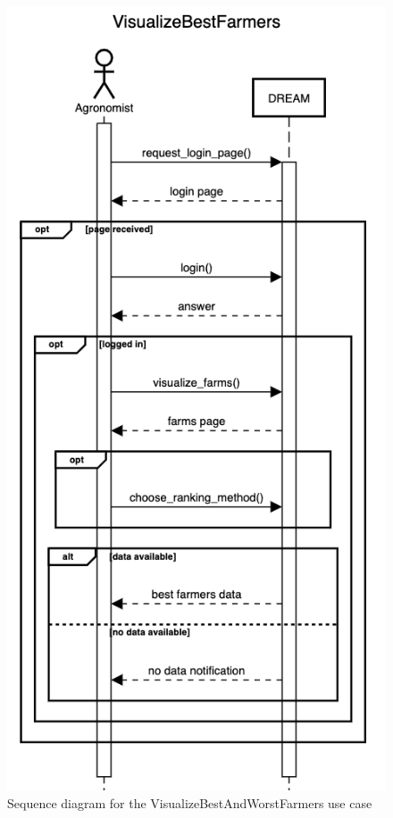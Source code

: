 \documentclass{article}
\begin{document}
\begin{figure}[H]
    \centering
	\includegraphics[scale=0.5]{sequence_diagrams/VisualizeBestFarmers}
    \caption{Sequence diagram for the VisualizeBestAndWorstFarmers use case}
\end{figure}
\end{document}

